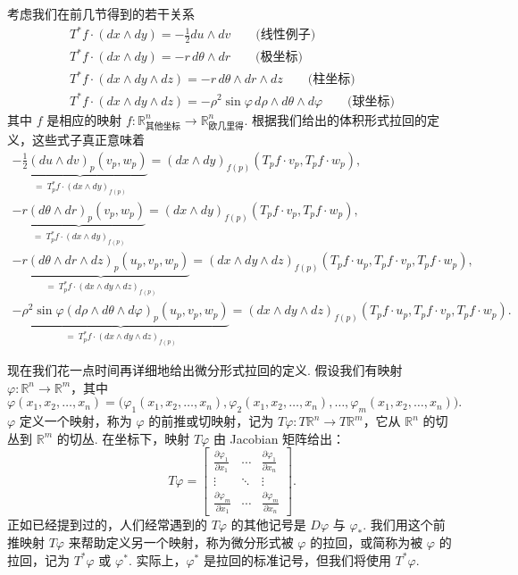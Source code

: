 考虑我们在前几节得到的若干关系
\begin{align*}
T^*f\cdot(dx\wedge dy)=-\frac12du\wedge dv\qquad\text{(线性例子)} \\
T^*f\cdot(dx\wedge dy)=-r\,d\theta\wedge dr\qquad\text{(极坐标)} \\
T^*f\cdot(dx\wedge dy\wedge dz)=-r\,d\theta\wedge dr\wedge dz\qquad\text{(柱坐标)} \\
T^*f\cdot(dx\wedge dy\wedge dz)=-\rho^2\sin\varphi\,d\rho\wedge d\theta\wedge d\varphi\qquad\text{(球坐标)}
\end{align*}
其中 $f$ 是相应的映射 $f:\mathbb{R}^{n}_{\text{其他坐标}}\to\mathbb{R}^{n}_{\text{欧几里得}}$. 根据我们给出的体积形式拉回的定义，这些式子真正意味着
\begin{align*}
\underbrace{-\frac12(du\wedge dv)_p(v_p,w_p)}_{=\ T_p^*f\cdot(dx\wedge dy)_{f(p)}}=(dx\wedge dy)_{f(p)}(T_pf\cdot v_p,T_pf\cdot w_p), \\
\underbrace{-r(d\theta\wedge dr)_p(v_p,w_p)}_{=\ T_p^*f\cdot(dx\wedge dy)_{f(p)}}=(dx\wedge dy)_{f(p)}(T_pf\cdot v_p,T_pf\cdot w_p), \\
\underbrace{-r(d\theta\wedge dr\wedge dz)_p(u_p,v_p,w_p)}_{=\ T_p^*f\cdot(dx\wedge dy\wedge dz)_{f(p)}}=(dx\wedge dy\wedge dz)_{f(p)}(T_pf\cdot u_p,T_pf\cdot v_p,T_pf\cdot w_p), \\
\underbrace{-\rho^2\sin\varphi(d\rho\wedge d\theta\wedge d\varphi)_p(u_p,v_p,w_p)}_{=\ T_p^*f\cdot(dx\wedge dy\wedge dz)_{f(p)}}=(dx\wedge dy\wedge dz)_{f(p)}(T_pf\cdot u_p,T_pf\cdot v_p,T_pf\cdot w_p).
\end{align*}

现在我们花一点时间再详细地给出微分形式拉回的定义. 假设我们有映射 $\varphi:\mathbb{R}^n\to\mathbb{R}^m$，其中
\[
\varphi(x_1,x_2,\ldots,x_n)=\bigl(\varphi_1(x_1,x_2,\ldots,x_n),\varphi_2(x_1,x_2,\ldots,x_n),\ldots,\varphi_m(x_1,x_2,\ldots,x_n)\bigr).
\]
$\varphi$ 定义一个映射，称为 $\varphi$ 的前推或切映射，记为 $T\varphi:T\mathbb{R}^n\to T\mathbb{R}^m$，它从 $\mathbb{R}^n$ 的切丛到 $\mathbb{R}^m$ 的切丛. 在坐标下，映射 $T\varphi$ 由 Jacobian 矩阵给出：
\[
T\varphi=
\begin{bmatrix}
\frac{\partial\varphi_1}{\partial x_1}&\cdots&\frac{\partial\varphi_1}{\partial x_n}\\
\vdots&\ddots&\vdots\\
\frac{\partial\varphi_m}{\partial x_1}&\cdots&\frac{\partial\varphi_m}{\partial x_n}
\end{bmatrix}.
\]
正如已经提到过的，人们经常遇到的 $T\varphi$ 的其他记号是 $D\varphi$ 与 $\varphi_*$. 我们用这个前推映射 $T\varphi$ 来帮助定义另一个映射，称为微分形式被 $\varphi$ 的拉回，或简称为被 $\varphi$ 的拉回，记为 $T^*\varphi$ 或 $\varphi^*$. 实际上，$\varphi^*$ 是拉回的标准记号，但我们将使用 $T^*\varphi$.

